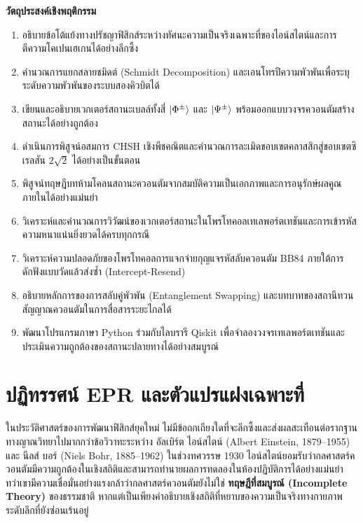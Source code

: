 \begin{lessonplanbox}
\noindent\textbf{วัตถุประสงค์เชิงพฤติกรรม}
\begin{enumerate}
    \item อธิบายข้อโต้แย้งทางปรัชญาฟิสิกส์ระหว่างทัศนะความเป็นจริงเฉพาะที่ของไอน์สไตน์และการตีความโคเปนเฮเกนได้อย่างลึกซึ้ง
    \item คำนวณการแยกสลายชมิดต์ (Schmidt Decomposition) และเอนโทรปีความพัวพันเพื่อระบุระดับความพัวพันของระบบสองคิวบิตได้
    \item เขียนและอธิบายเวกเตอร์สถานะเบลล์ทั้งสี่ $\ket{\Phi^\pm}$ และ $\ket{\Psi^\pm}$ พร้อมออกแบบวงจรควอนตัมสร้างสถานะได้อย่างถูกต้อง
    \item ดำเนินการพิสูจน์อสมการ CHSH เชิงพีชคณิตและคำนวณการละเมิดขอบเขตคลาสสิกสู่ขอบเขตซิเรลสัน $2\sqrt{2}$ ได้อย่างเป็นขั้นตอน
    \item พิสูจน์ทฤษฎีบทห้ามโคลนสถานะควอนตัมจากสมบัติความเป็นเอกภาพและการอนุรักษ์ผลคูณภายในได้อย่างแม่นยำ
    \item วิเคราะห์และคำนวณการวิวัฒน์ของเวกเตอร์สถานะในโพรโทคอลเทเลพอร์ตเทชันและการเข้ารหัสความหนาแน่นยิ่งยวดได้ครบทุกกรณี
    \item วิเคราะห์ความปลอดภัยของโพรโทคอลการแจกจ่ายกุญแจรหัสลับควอนตัม BB84 ภายใต้การดักฟังแบบวัดแล้วส่งซ้ำ (Intercept-Resend)
    \item อธิบายหลักการของการสลับคู่พัวพัน (Entanglement Swapping) และบทบาทของสถานีทวนสัญญาณควอนตัมในการสื่อสารระยะไกลได้
    \item พัฒนาโปรแกรมภาษา Python ร่วมกับไลบรารี Qiskit เพื่อจำลองวงจรเทเลพอร์ตเทชันและประเมินความถูกต้องของสถานะปลายทางได้อย่างสมบูรณ์
\end{enumerate}
\end{lessonplanbox}

\newpage
\section{ปฏิทรรศน์ EPR และตัวแปรแฝงเฉพาะที่}

ในประวัติศาสตร์ของการพัฒนาฟิสิกส์ยุคใหม่ ไม่มีข้อถกเถียงใดที่จะลึกซึ้งและส่งผลสะเทือนต่อรากฐานทางญาณวิทยาไปมากกว่าข้อวิวาทะระหว่าง อัลเบิร์ต ไอน์สไตน์ (Albert Einstein, 1879--1955) และ นีลส์ บอร์ (Niels Bohr, 1885--1962) ในช่วงทศวรรษ 1930 ไอน์สไตน์ยอมรับว่ากลศาสตร์ควอนตัมมีความถูกต้องในเชิงสถิติและสามารถทำนายผลการทดลองในห้องปฏิบัติการได้อย่างแม่นยำ ทว่าเขามีความเชื่อมั่นอย่างแรงกล้าว่ากลศาสตร์ควอนตัมยังไม่ใช่ \textbf{ทฤษฎีที่สมบูรณ์ (Incomplete Theory)} ของธรรมชาติ หากแต่เป็นเพียงคำอธิบายเชิงสถิติที่หยาบของความเป็นจริงทางกายภาพระดับลึกที่ยังซ่อนเร้นอยู่

